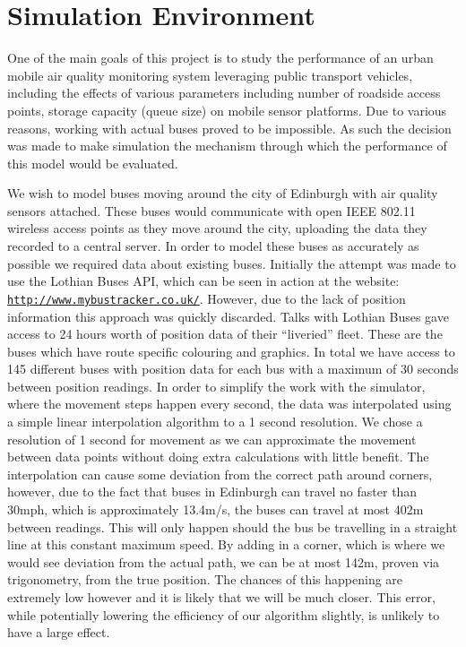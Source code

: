 \chapter{Simulation Environment}\label{simulation}

    
    One of the main goals of this project is to study the performance of an urban mobile air quality monitoring system leveraging public transport vehicles, including the effects of various parameters including number of roadside access points, storage capacity (queue size) on mobile sensor platforms. Due to various reasons, working with actual buses proved to be impossible. As such the decision was made to make simulation the mechanism through which the performance of this model would be evaluated. 

    We wish to model buses moving around the city of Edinburgh with air quality sensors attached. These buses would communicate with open IEEE 802.11 wireless access points as they move around the city, uploading the data they recorded to a central server. In order to model these buses as accurately as possible we required data about existing buses. Initially the attempt was made to use the Lothian Buses API, which can be seen in action at the website: \href{http://www.mybustracker.co.uk/}{\nolinkurl{http://www.mybustracker.co.uk/}}. However, due to the lack of position information this approach was quickly discarded. Talks with Lothian Buses gave access to 24 hours worth of position data of their ``liveried'' fleet. These are the buses which have route specific colouring and graphics. In total we have access to 145 different buses with position data for each bus with a maximum of 30 seconds between position readings. In order to simplify the work with the simulator, where the movement steps happen every second, the data was interpolated using a simple linear interpolation algorithm to a 1 second resolution. We chose a resolution of 1 second for movement as we can approximate the movement between data points without doing extra calculations with little benefit. The interpolation can cause some deviation from the correct path around corners, however, due to the fact that buses in Edinburgh can travel no faster than 30mph, which is approximately 13.4m/s, the buses can travel at most 402m between readings. This will only happen should the bus be travelling in a straight line at this constant maximum speed. By adding in a corner, which is where we would see deviation from the actual path, we can be at most 142m, proven via trigonometry, from the true position. The chances of this happening are extremely low however and it is likely that we will be much closer. This error, while potentially lowering the efficiency of our algorithm slightly, is unlikely to have a large effect.

